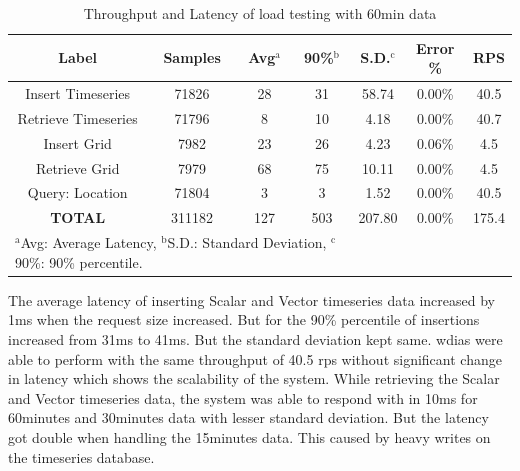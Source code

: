 \documentclass[conference]{IEEEtran}
\begin{document}
\begin{table}[htbp]
\caption{ Throughput and Latency of load testing with 60min data}
\begin{center}
\footnotesize
\begin{adjustbox}{width=0.49\textwidth}
\begin{tabular}{|c|c|c|c|c|c|c|}
\hline
\textbf{Label} & \textbf{Samples} & \textbf{Avg$^{\mathrm{a}}$} & \textbf{90\%$^{\mathrm{b}}$} & \textbf{S.D.$^{\mathrm{c}}$} & \textbf{Error \%} & \textbf{RPS} \\ \hline
Insert Timeseries & 71826 & 28 & 31 & 58.74 & 0.00\% & 40.5 \\ \hline
Retrieve Timeseries & 71796 & 8 & 10 & 4.18 & 0.00\% & 40.7 \\ \hline
Insert Grid & 7982 & 23 & 26 & 4.23 & 0.06\% & 4.5 \\ \hline
Retrieve Grid & 7979 & 68 & 75 & 10.11 & 0.00\% & 4.5 \\ \hline
Query: Location & 71804 & 3 & 3 & 1.52 & 0.00\% & 40.5 \\ \hline
\textbf{TOTAL} & 311182 & 127 & 503 & 207.80 & 0.00\% & 175.4 \\ \hline
\multicolumn{4}{l}{$^{\mathrm{a}}$Avg: Average Latency, $^{\mathrm{b}}$S.D.: Standard Deviation, $^{\mathrm{c}}$90\%: 90\% percentile.}
\end{tabular}
\end{adjustbox}
\label{ptab:obs_all_60_min_summary_throughput}
\end{center}
\end{table}

The average latency of inserting Scalar and Vector timeseries data increased by 1ms when the request size increased. But for the 90\% percentile of insertions increased from 31ms to 41ms. But the standard deviation kept same. \acrshort{wdias} were able to perform with the same throughput of 40.5 \acrshort{rps} without significant change in latency which shows the scalability of the system.
While retrieving the Scalar and Vector timeseries data, the system was able to respond with in 10ms for 60minutes and 30minutes data with lesser standard deviation. But the latency got double when handling the 15minutes data. This caused by heavy writes on the timeseries database.
\end{document}
